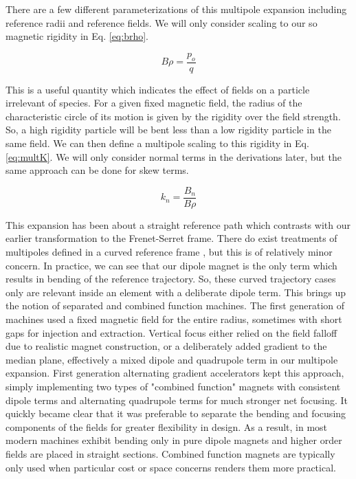 There are a few different parameterizations of this multipole expansion including reference radii and reference fields. We will only consider scaling to our so magnetic rigidity in Eq. \ref{eq:brho}. 

\begin{equation} \label{eq:brho}
	B\rho = \frac{p_o}{q}
\end{equation}

This is a useful quantity which indicates the effect of fields on a particle irrelevant of species. For a given fixed magnetic field, the radius of the characteristic circle of its motion is given by the rigidity over the field strength. So, a high rigidity particle will be bent less than a low rigidity particle in the same field. We can then define a multipole scaling to this rigidity in Eq. \ref{eq:multK}. We will only consider normal terms in the derivations later, but the same approach can be done for skew terms.

\begin{equation} \label{eq:multK}
	k_n = \frac{B_n}{B\rho}
\end{equation}

This expansion has been about a straight reference path which contrasts with our earlier transformation to the Frenet-Serret frame. There do exist treatments of multipoles defined in a curved reference frame \cite{ZolkinMultipole}, but this is of relatively minor concern. In practice, we can see that our dipole magnet is the only term which results in bending of the reference trajectory. So, these curved trajectory cases only are relevant inside an element with a deliberate dipole term. This brings up the notion of separated and combined function machines. The first generation of machines used a fixed magnetic field for the entire radius, sometimes with short gaps for injection and extraction. Vertical focus either relied on the field falloff due to realistic magnet construction, or a deliberately added gradient to the median plane, effectively a mixed dipole and quadrupole term in our multipole expansion. First generation alternating gradient accelerators kept this approach, simply implementing two types of "combined function" magnets with consistent dipole terms and alternating quadrupole terms for much stronger net focusing. It quickly became clear that it was preferable to separate the bending and focusing components of the fields for greater flexibility in design. As a result, in most modern machines exhibit bending only in pure dipole magnets and higher order fields are placed in straight sections. Combined function magnets are typically only used when particular cost or space concerns renders them more practical.

